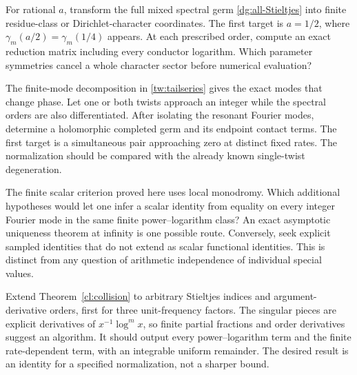 \begin{question}
For rational $a$, transform the full mixed spectral germ
\eqref{dg:all-Stieltjes} into finite residue-class or
Dirichlet-character coordinates. The first target is $a=1/2$,
where $\gamma_m(a/2)=\gamma_m(1/4)$ appears. At each prescribed
order, compute an exact reduction matrix including every
conductor logarithm. Which parameter symmetries cancel a
whole character sector before numerical evaluation?
\end{question}

\begin{question}
The finite-mode decomposition in \eqref{tw:tailseries} gives
the exact modes that change phase. Let one or both twists
approach an integer while the spectral orders are also
differentiated. After isolating the resonant Fourier modes,
determine a holomorphic completed germ and its endpoint contact
terms. The first target is a simultaneous pair approaching
zero at distinct fixed rates. The normalization should be
compared with the already known single-twist degeneration.
\end{question}

\begin{question}
The finite scalar criterion proved here uses local monodromy.
Which additional hypotheses would let one infer a scalar
identity from equality on every integer Fourier mode in the
same finite power--logarithm class? An exact asymptotic uniqueness
theorem at infinity is one possible route. Conversely, seek
explicit sampled identities that do not extend as scalar
functional identities. This is distinct from any question of
arithmetic independence of individual special values.
\end{question}

\begin{question}
Extend Theorem~\ref{cl:collision} to arbitrary Stieltjes indices
and argument-derivative orders, first for three unit-frequency
factors. The singular pieces are explicit derivatives of
$x^{-1}\log^m x$, so finite partial fractions and order
derivatives suggest an algorithm. It should output every
power--logarithm term and the finite rate-dependent term, with
an integrable uniform remainder. The desired result is an
identity for a specified normalization, not a sharper bound.
\end{question}

